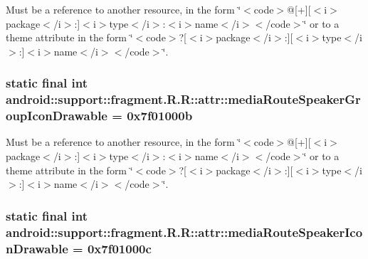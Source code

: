 Must be a reference to another resource, in the form \char`\"{}$<$code$>$@\mbox{[}+\mbox{]}\mbox{[}$<$i$>$package$<$/i$>$:\mbox{]}$<$i$>$type$<$/i$>$:$<$i$>$name$<$/i$>$$<$/code$>$\char`\"{} or to a theme attribute in the form \char`\"{}$<$code$>$?\mbox{[}$<$i$>$package$<$/i$>$:\mbox{]}\mbox{[}$<$i$>$type$<$/i$>$:\mbox{]}$<$i$>$name$<$/i$>$$<$/code$>$\char`\"{}. \hypertarget{classandroid_1_1support_1_1fragment_1_1_r_1_1attr_b6ae4dfb1d964c0d70d801c7c66054f0}{
\subsubsection[{mediaRouteSpeakerGroupIconDrawable}]{\setlength{\rightskip}{0pt plus 5cm}static final int android::support::fragment.R.R::attr::mediaRouteSpeakerGroupIconDrawable = 0x7f01000b}}
\label{classandroid_1_1support_1_1fragment_1_1_r_1_1attr_b6ae4dfb1d964c0d70d801c7c66054f0}


Must be a reference to another resource, in the form \char`\"{}$<$code$>$@\mbox{[}+\mbox{]}\mbox{[}$<$i$>$package$<$/i$>$:\mbox{]}$<$i$>$type$<$/i$>$:$<$i$>$name$<$/i$>$$<$/code$>$\char`\"{} or to a theme attribute in the form \char`\"{}$<$code$>$?\mbox{[}$<$i$>$package$<$/i$>$:\mbox{]}\mbox{[}$<$i$>$type$<$/i$>$:\mbox{]}$<$i$>$name$<$/i$>$$<$/code$>$\char`\"{}. \hypertarget{classandroid_1_1support_1_1fragment_1_1_r_1_1attr_66fcfd1799a3aec83bcf2c1bd1957308}{
\subsubsection[{mediaRouteSpeakerIconDrawable}]{\setlength{\rightskip}{0pt plus 5cm}static final int android::support::fragment.R.R::attr::mediaRouteSpeakerIconDrawable = 0x7f01000c}}
\label{classandroid_1_1support_1_1fragment_1_1_r_1_1attr_66fcfd1799a3aec83bcf2c1bd1957308}


